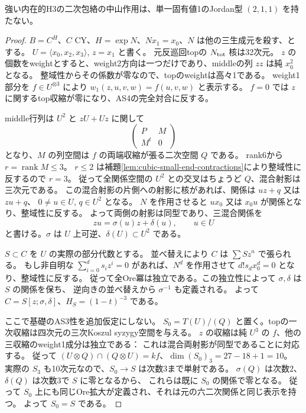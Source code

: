 \begin{theorem}\label{thm:cubic-jordan211-unipotent-empty}
強い内在的H3の二次包絡の中山作用は、単一固有値1のJordan型 $(2,1,1)$ を持たない。
\end{theorem}
\begin{proof}
$B=C^H$、$C$ CY、$H=\exp N$、$Nx_1=x_0$、$N$ は他の三生成元を殺す、とする。
$U=\langle x_0,x_2,x_3\rangle$, $z=x_1$ と書く。
元反巡回topの $N_{\rm tot}$ 核は32次元。
$z$ の個数をweightとすると、weight2方向は一つだけであり、middleの列 $zz$ は純 $x_0^2$ となる。
整域性からその係数が零なので、topのweightは高々1である。
weight1部分を $f\in U^{\otimes3}$ により
$w_1(z,u,v,w)=f(u,v,w)$ と表示する。
$f=0$ では $z$ に関するtop収縮が零になり、AS4の完全対合に反する。

middle行列は $U^2$ と $zU+Uz$ に関して
\[
 \begin{pmatrix}P&M\\M^t&0\end{pmatrix}
\]
となり、$M$ の列空間は $f$ の両端収縮が張る二次空間 $Q$ である。
rank6から $r=\operatorname{rank}M\le3$。
$r\le2$ は補題\ref{lem:cubic-small-end-contractions}により整域性に反するので $r=3$。
従って全関係空間の $U^2$ との交叉はちょうど $Q$、混合射影は三次元である。
この混合射影の片側への射影に核があれば、関係は $uz+q$ 又は $zu+q$、
$0\ne u\in U$, $q\in U^2$ となる。
$N$ を作用させると $ux_0$ 又は $x_0u$ が関係となり、整域性に反する。
よって両側の射影は同型であり、三混合関係を
\[
 zu=\sigma(u)z+\delta(u),\qquad u\in U
\]
と書ける。$\sigma$ は $U$ 上可逆、$\delta(U)\subset U^2$ である。

$S\subset C$ を $U$ の実際の部分代数とする。
並べ替えにより $C$ は $\sum S z^n$ で張られる。
もし非自明な $\sum_{i=0}^d s_i z^i=0$ があれば、$N^d$ を作用させて
$d!s_dx_0^d=0$ となり、整域性に反する。
従って全Ore冪は独立である。この独立性によって $\sigma,\delta$ は $S$ の関係を保ち、
逆向きの並べ替えから $\sigma^{-1}$ も定義される。
よって $C=S[z;\sigma,\delta]$、$H_S=(1-t)^{-3}$ である。

ここで基礎のAS3性を追加仮定にしない。
$S_0=T(U)/(Q)$ と置く。topの一次収縮は四次元の三次Koszul syzygy空間を与える。
$z$ の収縮は純 $U^3$ の $f$、他の三収縮のweight1成分は独立である：
これは混合両射影が同型であることに対応する。
従って $(U\otimes Q)\cap(Q\otimes U)=kf$、$\dim(S_0)_3=27-18+1=10$。
実際の $S_3$ も10次元なので、$S_0\to S$ は次数3まで単射である。
$\sigma(Q)$ は次数2、$\delta(Q)$ は次数3で $S$ に零となるから、
これらは既に $S_0$ の関係で零となる。
従って $S_0$ 上にも同じOre拡大が定義され、それは元の六二次関係と同じ表示を持つ。
よって $S_0=S$ である。


\end{proof}
